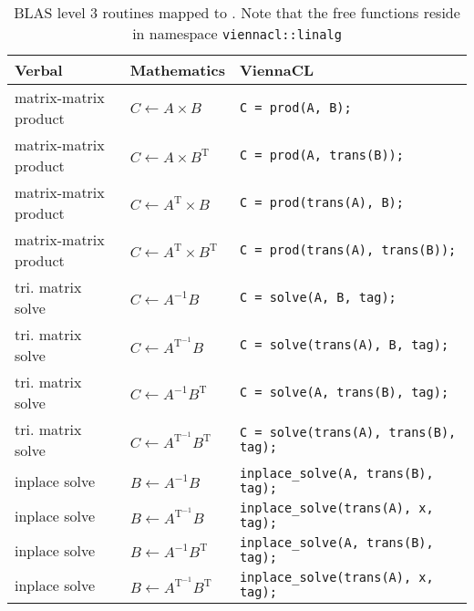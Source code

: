 \begin{table}[tb]
\begin{center}
\renewcommand{\arraystretch}{1.2}
\begin{tabular}{p{4cm}|l|p{7.5cm}}
Verbal & Mathematics & ViennaCL\\
\hline
matrix-matrix product & $C \leftarrow A \times B$ & \texttt{C = prod(A, B);}
\\
matrix-matrix product & $C \leftarrow A \times B^\mathrm{T}$ & \texttt{C =
prod(A, trans(B));} \\
matrix-matrix product & $C \leftarrow A^\mathrm{T} \times B$ & \texttt{C =
prod(trans(A), B);} \\
matrix-matrix product & $C \leftarrow A^\mathrm{T} \times B^\mathrm{T}$ &
\texttt{C = prod(trans(A), trans(B));} \\
\hline
tri. matrix solve & $C \leftarrow A^{-1} B$ & \texttt{C = solve(A, B, tag);}
\\
tri. matrix solve & $C \leftarrow A^\mathrm{T^{-1}} B$ & \texttt{C =
solve(trans(A), B, tag);} \\
tri. matrix solve & $C \leftarrow A^{-1} B^\mathrm{T}$ & \texttt{C = solve(A,
trans(B), tag);} \\
tri. matrix solve & $C \leftarrow A^\mathrm{T^{-1}} B^\mathrm{T}$ & \texttt{C
= solve(trans(A), trans(B), tag);} \\
%
inplace solve & $B \leftarrow A^{-1} B$ & \texttt{inplace\_solve(A, trans(B),
tag);} \\
inplace solve & $B \leftarrow A^\mathrm{T^{-1}} B$ &
\texttt{inplace\_solve(trans(A), x, tag);} \\
inplace solve & $B \leftarrow A^{-1} B^\mathrm{T}$ & \texttt{inplace\_solve(A,
trans(B), tag);} \\
inplace solve & $B \leftarrow A^\mathrm{T^{-1}} B^\mathrm{T}$ &
\texttt{inplace\_solve(trans(A), x, tag);} \\
\end{tabular}
\caption{BLAS level 3 routines mapped to \ViennaCL. Note that the free functions
reside in namespace \texttt{viennacl::linalg}}
\label{tab:blas-level-3}
\end{center}
\end{table}

